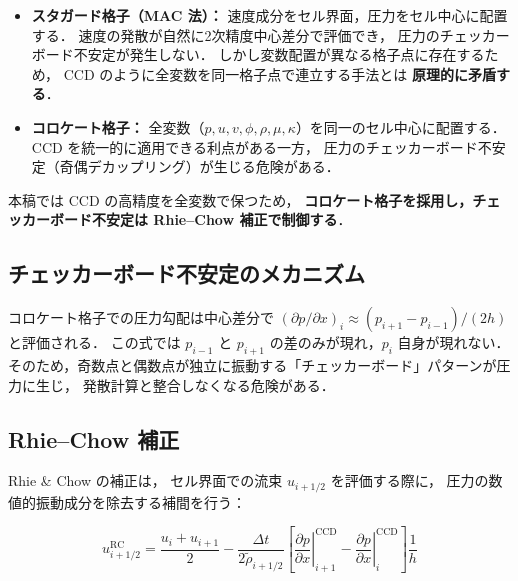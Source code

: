 \documentclass[12pt, a4paper, titlepage]{article}
\newcommand{\jp}[1]{{\normalfont\jpfont #1}}
\begin{document}
\begin{itemize}
  \item \jp{\textbf{スタガード格子（MAC 法）：}
        速度成分をセル界面，圧力をセル中心に配置する．
        速度の発散が自然に2次精度中心差分で評価でき，
        圧力のチェッカーボード不安定が発生しない．
        しかし変数配置が異なる格子点に存在するため，
        CCD のように全変数を同一格子点で連立する手法とは
        \textbf{原理的に矛盾する}．}

  \item \jp{\textbf{コロケート格子：}
        全変数（$p, u, v, \phi, \rho, \mu, \kappa$）を同一のセル中心に配置する．
        CCD を統一的に適用できる利点がある一方，
        圧力のチェッカーボード不安定（奇偶デカップリング）が生じる危険がある．}
\end{itemize}

\jp{本稿では CCD の高精度を全変数で保つため，
\textbf{コロケート格子を採用し，チェッカーボード不安定は Rhie--Chow 補正で制御する}．}

\subsection{\jp{チェッカーボード不安定のメカニズム}}

\jp{コロケート格子での圧力勾配は中心差分で
$(\partial p/\partial x)_i \approx (p_{i+1}-p_{i-1})/(2h)$ と評価される．
この式では $p_{i-1}$ と $p_{i+1}$ の差のみが現れ，$p_i$ 自身が現れない．
そのため，奇数点と偶数点が独立に振動する「チェッカーボード」パターンが圧力に生じ，
発散計算と整合しなくなる危険がある．}

\subsection{Rhie--Chow \jp{補正}}

\jp{Rhie \& Chow \cite{RhieChow1983} の補正は，
セル界面での流束 $u_{i+1/2}$ を評価する際に，
圧力の数値的振動成分を除去する補間を行う：}
\begin{tcolorbox}[mybox, title={Rhie--Chow \jp{補正速度（セル界面）}}]
\begin{equation}
  u_{i+1/2}^{\mathrm{RC}}
  = \frac{u_i + u_{i+1}}{2}
  - \frac{\Delta t}{2\tilde\rho_{i+1/2}}
    \!\left[
      \left.\frac{\partial p}{\partial x}\right|_{i+1}^{\mathrm{CCD}}
      - \left.\frac{\partial p}{\partial x}\right|_{i}^{\mathrm{CCD}}
    \right]\frac{1}{h}
  \label{eq:rhie_chow}
\end{equation}
\end{tcolorbox}
\end{document}
